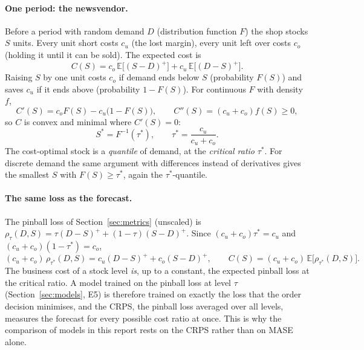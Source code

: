 \documentclass[11pt,a4paper]{article}
\newcommand{\E}{\mathbb{E}}
\begin{document}
\paragraph{One period: the newsvendor.} Before a period with random demand $D$ (distribution
function $F$) the shop stocks $S$ units. Every unit short costs $c_u$ (the lost margin), every
unit left over costs $c_o$ (holding it until it can be sold). The expected cost is
\begin{equation}
  C(S) = c_o\,\E\bigl[(S - D)^+\bigr] + c_u\,\E\bigl[(D - S)^+\bigr].
  \label{eq:newsvendor}
\end{equation}
Raising $S$ by one unit costs $c_o$ if demand ends below $S$ (probability $F(S)$) and saves
$c_u$ if it ends above (probability $1 - F(S)$). For continuous $F$ with density $f$,
\begin{equation}
  C'(S) = c_o F(S) - c_u\bigl(1 - F(S)\bigr), \qquad C''(S) = (c_u + c_o) f(S) \ge 0,
\end{equation}
so $C$ is convex and minimal where $C'(S) = 0$:
\begin{equation}
  S^* = F^{-1}(\tau^*), \qquad \tau^* = \frac{c_u}{c_u + c_o}.
  \label{eq:critical}
\end{equation}
The cost-optimal stock is a \emph{quantile} of demand, at the \emph{critical ratio} $\tau^*$.
For discrete demand the same argument with differences instead of derivatives gives the
smallest $S$ with $F(S) \ge \tau^*$, again the $\tau^*$-quantile.

\paragraph{The same loss as the forecast.} The pinball loss of Section~\ref{sec:metrics}
(unscaled) is $\rho_\tau(D, S) = \tau (D - S)^+ + (1 - \tau)(S - D)^+$. Since
$(c_u + c_o)\tau^* = c_u$ and $(c_u + c_o)(1 - \tau^*) = c_o$,
\begin{equation}
  (c_u + c_o)\,\rho_{\tau^*}(D, S) = c_u (D - S)^+ + c_o (S - D)^+ ,
  \qquad
  C(S) = (c_u + c_o)\,\E\bigl[\rho_{\tau^*}(D, S)\bigr].
\end{equation}
The business cost of a stock level \emph{is}, up to a constant, the expected pinball loss at the
critical ratio. A model trained on the pinball loss at level $\tau$ (Section~\ref{sec:models},
E5) is therefore trained on exactly the loss that the order decision minimises, and the CRPS,
the pinball loss averaged over all levels, measures the forecast for every possible cost
ratio at once. This is why the comparison of models in this report rests on the CRPS rather
than on MASE alone.
\end{document}
